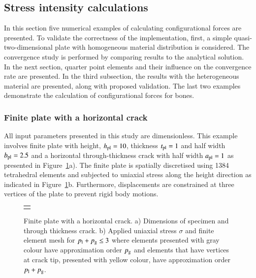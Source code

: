 \documentclass[11pt]{acmeArticle}
\numberwithin{equation}{section}
\begin{document}
\subsection{Stress intensity calculations}
\label{sec:release_energy_rate}
In this section five numerical examples of calculating configurational forces are presented. 
To validate the correctness of the implementation, first, a simple quasi-two-dimensional plate with homogeneous material distribution is considered. 
The convergence study is performed by comparing results to the analytical solution. 
In the next section, quarter point elements and their influence on the convergence rate are presented. 
In the third subsection, the results with the heterogeneous material are presented, along with proposed validation. 
The last two examples demonstrate the calculation of configurational forces for bones.  
\subsubsection{Finite plate with a horizontal crack}\label{sec:plate_section}
All input parameters presented in this study are dimensionless. 
This example involves finite plate with height, $h_{\rm {pl}} = 10$, thickness $t_{\rm {pl}}=1$ and half width $b_{\rm{pl}} = 2.5$ and a horizontal through-thickness crack with half width $a_{\rm {pl}} = 1$ as presented in Figure~\ref{fig:plate_load_mesh}a).
The finite plate is spatially discretised using 1384 tetrahedral elements and subjected to uniaxial stress along the height direction as indicated in Figure~\ref{fig:plate_load_mesh}b. 
Furthermore, displacements are constrained at three vertices of the plate to prevent rigid body motions. 

\begin{figure}[h!]
\begin{center}
\begin{tabular}{c}
{\def\svgwidth{17cm} }\\
\end{tabular}
\caption{Finite plate with a horizontal crack. a) Dimensions of specimen and through thickness crack. b) Applied uniaxial stress $\sigma$ and finite element mesh for $p_{\rm l} + p_{\rm g} \leq 3$ where elements presented with gray colour have approximation order $p_{\rm g}$ and elements that have vertices at crack tip, presented with yellow colour, have approximation order $p_{\rm l}+p_{\rm g}$.}
\label{fig:plate_load_mesh}
\end{center}
\end{figure}
\end{document}
